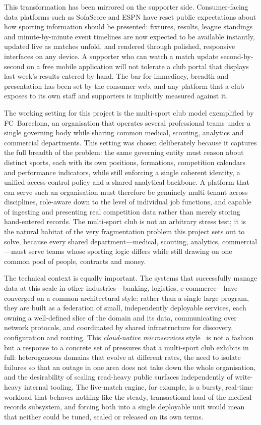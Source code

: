 This transformation has been mirrored on the supporter side. Consumer-facing data
platforms such as SofaScore and ESPN have reset public expectations about how sporting
information should be presented: fixtures, results, league standings and minute-by-minute
event timelines are now expected to be available instantly, updated live as matches unfold,
and rendered through polished, responsive interfaces on any device. A supporter who can
watch a match update second-by-second on a free mobile application will not tolerate a club
portal that displays last week's results entered by hand. The bar for immediacy, breadth and
presentation has been set by the consumer web, and any platform that a club exposes to its
own staff and supporters is implicitly measured against it.

The working setting for this project is the multi-sport club model exemplified by
FC~Barcelona, an organisation that operates several professional teams under a single
governing body while sharing common medical, scouting, analytics and commercial
departments. This setting was chosen deliberately because it captures the full breadth of
the problem: the same governing entity must reason about distinct sports, each with its own
positions, formations, competition calendars and performance indicators, while still
enforcing a single coherent identity, a unified access-control policy and a shared analytical
backbone. A platform that can serve such an organisation must therefore be genuinely
multi-tenant across disciplines, role-aware down to the level of individual job functions, and
capable of ingesting and presenting real competition data rather than merely storing
hand-entered records. The multi-sport club is not an arbitrary stress test; it is the natural
habitat of the very fragmentation problem this project sets out to solve, because every
shared department---medical, scouting, analytics, commercial---must serve teams whose
sporting logic differs while still drawing on one common pool of people, contracts and money.

The technical context is equally important. The systems that successfully manage data at
this scale in other industries---banking, logistics, e-commerce---have converged on a
common architectural style: rather than a single large program, they are built as a federation
of small, independently deployable services, each owning a well-defined slice of the domain
and its data, communicating over network protocols, and coordinated by shared
infrastructure for discovery, configuration and routing. This \emph{cloud-native
microservices} style~\cite{microservices} is not a fashion but a response to a concrete set of
pressures that a multi-sport club exhibits in full: heterogeneous domains that evolve at
different rates, the need to isolate failures so that an outage in one area does not take down
the whole organisation, and the desirability of scaling read-heavy public surfaces
independently of write-heavy internal tooling. The live-match engine, for example, is a
bursty, real-time workload that behaves nothing like the steady, transactional load of the
medical records subsystem, and forcing both into a single deployable unit would mean that
neither could be tuned, scaled or released on its own terms.

